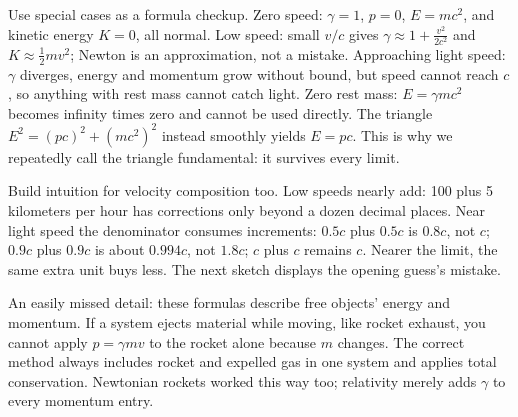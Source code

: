 \begin{mainline}
Use special cases as a formula checkup. Zero speed: \(\gamma=1\), \(p=0\), \(E=mc^{2}\), and kinetic energy \(K=0\), all normal. Low speed: small \(v/c\) gives \(\gamma\approx1+\tfrac{v^{2}}{2c^{2}}\) and \(K\approx\tfrac12 mv^{2}\); Newton is an approximation, not a mistake. Approaching light speed: \(\gamma\) diverges, energy and momentum grow without bound, but speed cannot reach \(c\), so anything with rest mass cannot catch light. Zero rest mass: \(E=\gamma mc^{2}\) becomes infinity times zero and cannot be used directly. The triangle \(E^{2}=(pc)^{2}+(mc^{2})^{2}\) instead smoothly yields \(E=pc\). This is why we repeatedly call the triangle fundamental: it survives every limit.

Build intuition for velocity composition too. Low speeds nearly add: 100 plus 5 kilometers per hour has corrections only beyond a dozen decimal places. Near light speed the denominator consumes increments: \(0.5c\) plus \(0.5c\) is \(0.8c\), not \(c\); \(0.9c\) plus \(0.9c\) is about \(0.994c\), not \(1.8c\); \(c\) plus \(c\) remains \(c\). Nearer the limit, the same extra unit buys less. The next sketch displays the opening guess's mistake.
\end{mainline}

\begin{center}
\end{center}

\begin{mainline}
An easily missed detail: these formulas describe free objects' energy and momentum. If a system ejects material while moving, like rocket exhaust, you cannot apply \(p=\gamma mv\) to the rocket alone because \(m\) changes. The correct method always includes rocket and expelled gas in one system and applies total conservation. Newtonian rockets worked this way too; relativity merely adds \(\gamma\) to every momentum entry.
\end{mainline}

